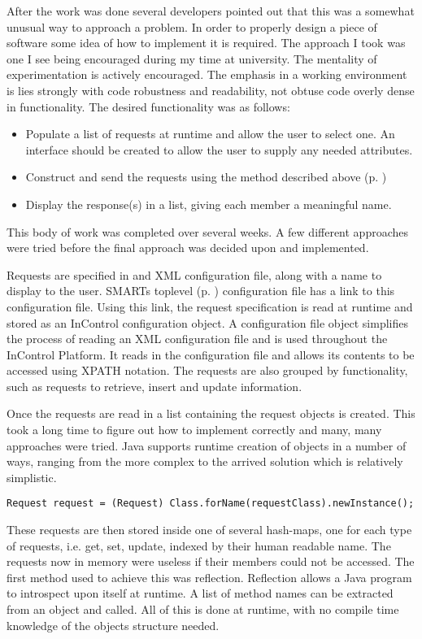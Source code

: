 \documentclass[a4paper, 11pt, titlepage]{article}
\begin{document}
After the work was done several developers pointed out that this was a somewhat unusual way to approach a problem. In order to properly design a piece of software some idea of how to implement it is required. The approach I took was one I see being encouraged during my time at university. The mentality of experimentation is actively encouraged. The emphasis in a working environment is lies strongly with code robustness and readability, not obtuse code overly dense in functionality. 
The desired functionality was as follows: 
\begin{itemize} 
\item Populate a list of requests at runtime and allow the user to select one. An interface should be created to allow the user to supply any needed attributes. 
\item Construct and send the requests using the method described above (p. \pageref{cronos_generic_api}) 
\item Display the response(s) in a list, giving each member a meaningful name. 
\end{itemize} 
This body of work was completed over several weeks. A few different approaches were tried before the final approach was decided upon and implemented. 

Requests are specified in and XML configuration file, along with a name to display to the user. SMARTs toplevel (p. \pageref{toplevel}) configuration file has a link to this configuration file. Using this link, the request specification is read at runtime and stored as an InControl configuration object. A configuration file object simplifies the process of reading an XML configuration file and is used throughout the InControl Platform. It reads in the configuration file and allows its contents to be accessed using XPATH notation. The requests are also grouped by functionality, such as requests to retrieve, insert and update information. 

Once the requests are read in a list containing the request objects is created. This took a long time to figure out how to implement correctly and many, many approaches were tried. Java supports runtime creation of objects in a number of ways, ranging from the more complex to the arrived solution which is relatively simplistic. \cite{forName}
\label{smart_dynamic_create}
\begin{verbatim} 
Request request = (Request) Class.forName(requestClass).newInstance(); 
\end{verbatim} 
These requests are then stored inside one of several hash-maps, one for each type of requests, i.e. get, set, update, indexed by their human readable name. 
The requests now in memory were useless if their members could not be accessed. The first method used to achieve this was reflection. Reflection allows a Java program to introspect upon itself at runtime. A list of method names can be extracted from an object and called. All of this is done at runtime, with no compile time knowledge of the objects structure needed.\cite{Reflection} 
\end{document}
